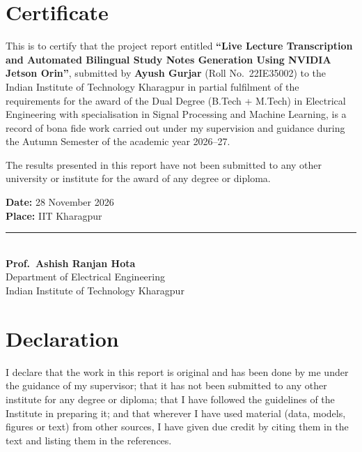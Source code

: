\documentclass[11pt,a4paper,oneside]{report}
\theoremstyle{definition}
\begin{document}
\setcounter{page}{2}

\chapter*{Certificate}
\thispagestyle{plain}

This is to certify that the project report entitled \textbf{``Live Lecture Transcription and Automated Bilingual Study Notes Generation Using NVIDIA Jetson Orin''}, submitted by \textbf{Ayush Gurjar} (Roll No.\ 22IE35002) to the Indian Institute of Technology Kharagpur in partial fulfilment of the requirements for the award of the Dual Degree (B.Tech + M.Tech) in Electrical Engineering with specialisation in Signal Processing and Machine Learning, is a record of bona fide work carried out under my supervision and guidance during the Autumn Semester of the academic year 2026--27.

The results presented in this report have not been submitted to any other university or institute for the award of any degree or diploma.

\vspace{30mm}
\noindent
\begin{minipage}[t]{0.48\textwidth}
\textbf{Date:} 28 November 2026\\[3pt]
\textbf{Place:} IIT Kharagpur
\end{minipage}\hfill
\begin{minipage}[t]{0.46\textwidth}
\rule{60mm}{0.4pt}\\[3pt]
\textbf{Prof.\ Ashish Ranjan Hota}\\
Department of Electrical Engineering\\
Indian Institute of Technology Kharagpur
\end{minipage}

\chapter*{Declaration}
\thispagestyle{plain}

I declare that the work in this report is original and has been done by me under the guidance of my supervisor; that it has not been submitted to any other institute for any degree or diploma; that I have followed the guidelines of the Institute in preparing it; and that wherever I have used material (data, models, figures or text) from other sources, I have given due credit by citing them in the text and listing them in the references.
\end{document}
